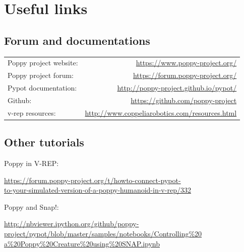 \documentclass{article}
\begin{document}


\section{Useful links}
\label{documentation-links}

\subsection{Forum and documentations}

\begin{tabular}{lr}

Poppy project website: & \url{https://www.poppy-project.org/} \\ 

Poppy project forum: & \url{https://forum.poppy-project.org/} \\ 
 
Pypot documentation: & \url{http://poppy-project.github.io/pypot/} \\ 

Github: & \url{https://github.com/poppy-project} \\ 

v-rep resources: & \url{http://www.coppeliarobotics.com/resources.html} \\ 
\end{tabular} 

\subsection{Other tutorials}

Poppy in V-REP:

\begin{flushright}
 \href{https://forum.poppy-project.org/t/howto-connect-pypot-to-your-simulated-version-of-a-poppy-humanoid-in-v-rep/332}{https://forum.poppy-project.org/t/howto-connect-pypot-\\to-your-simulated-version-of-a-poppy-humanoid-in-v-rep/332}
 \end{flushright}

Poppy and Snap!:

\begin{flushright}
\href{http://nbviewer.ipython.org/github/poppy-project/pypot/blob/master/samples/notebooks/Controlling%20a%20Poppy%20Creature%20using%20SNAP.ipynb}{http://nbviewer.ipython.org/github/poppy-project/pypot/blob/master/samples/notebooks/Controlling\%20\\a\%20Poppy\%20Creature\%20using\%20SNAP.ipynb}

\end{flushright}
\end{document}
